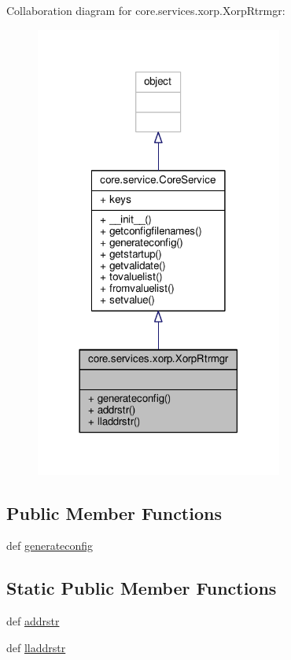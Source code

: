 Collaboration diagram for core.\+services.\+xorp.\+Xorp\+Rtrmgr\+:
\nopagebreak
\begin{figure}[H]
\begin{center}
\leavevmode
\includegraphics[width=230pt]{classcore_1_1services_1_1xorp_1_1_xorp_rtrmgr__coll__graph}
\end{center}
\end{figure}
\subsection*{Public Member Functions}
\begin{DoxyCompactItemize}
\item 
def \hyperlink{classcore_1_1services_1_1xorp_1_1_xorp_rtrmgr_ae8c6a221f473f6ac628bc936e4fabaff}{generateconfig}
\end{DoxyCompactItemize}
\subsection*{Static Public Member Functions}
\begin{DoxyCompactItemize}
\item 
def \hyperlink{classcore_1_1services_1_1xorp_1_1_xorp_rtrmgr_aa5b2d8a1109c16130b0ca5d1d8630bc3}{addrstr}
\item 
def \hyperlink{classcore_1_1services_1_1xorp_1_1_xorp_rtrmgr_add501cba2ef69467aa5c893fa07dee23}{lladdrstr}
\end{DoxyCompactItemize}
